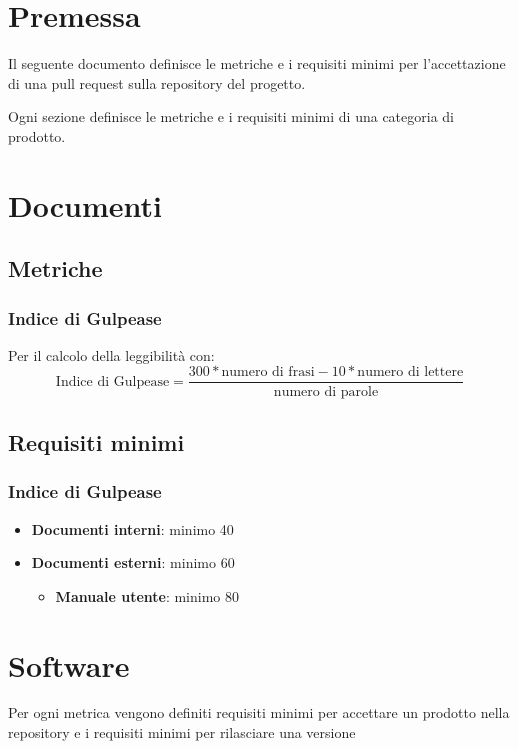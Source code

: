 \documentclass[a4paper, 12pt]{article}
\begin{document}
\makefrontpage

\makeversioni

\section{Premessa}
Il seguente documento definisce le metriche e i requisiti minimi per l'accettazione di una pull request sulla repository del progetto. 

Ogni sezione definisce le metriche e i requisiti minimi di una categoria di prodotto.

\section{Documenti}
\subsection{Metriche}
\subsubsection{Indice di Gulpease}
Per il calcolo della leggibilità con:
\[ \text{Indice di Gulpease} = \frac{300*\text{numero di frasi} - 10*\text{numero di lettere}}{\text{numero di parole}} \]


\subsection{Requisiti minimi}
\subsubsection{Indice di Gulpease}
\begin{itemize}
	\item \textbf{Documenti interni}: minimo 40
	\item \textbf{Documenti esterni}: minimo 60
	\begin{itemize}
		\item \textbf{Manuale utente}: minimo 80
	\end{itemize}
\end{itemize}

\section{Software}
Per ogni metrica vengono definiti requisiti minimi per accettare un prodotto nella repository e i requisiti minimi per rilasciare una versione
	
\end{document}
